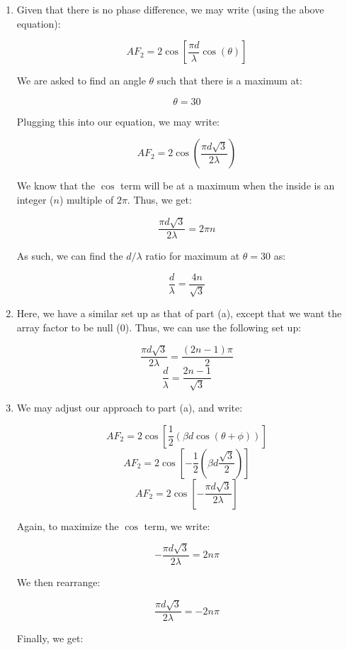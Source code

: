 \begin{enumerate}
    \begin{enumerate}

      \item 

        Given that there is no phase difference, we may write (using the above equation):

        $$AF_2=2\cos\left[ \frac{\pi d}{\lambda}\cos(\theta) \right]$$

        We are asked to find an angle $\theta$ such that there is a maximum at:

        $$\theta=30$$

        Plugging this into our equation, we may write:

        $$AF_2=2\cos\left(\frac{\pi d\sqrt{3}}{2\lambda}\right)$$

        We know that the $\cos$ term will be at a maximum when the inside is an integer ($n$) multiple of $2\pi$. Thus, we get:

        $$\frac{\pi d\sqrt{3}}{2\lambda}=2\pi n$$

        As such, we can find the $d/\lambda$ ratio for maximum at $\theta=30$ as:

        $$\boxed{\frac{d}{\lambda}=\frac{4n}{\sqrt{3}}}$$

      \item 

        Here, we have a similar set up as that of part (a), except that we want the array factor to be null (0). Thus, we can use the following set up:

        $$\frac{\pi d\sqrt{3}}{2\lambda}=\frac{(2n-1)\pi}{2}$$
        $$\boxed{\frac{d}{\lambda}=\frac{2n-1}{\sqrt{3}}}$$

      \item 

        We may adjust our approach to part (a), and write:

        $$AF_2=2\cos\left[ \frac{1}{2}\left( \beta d\cos(\theta+\phi) \right) \right]$$
        $$AF_2=2\cos\left[ -\frac{1}{2}\left( \beta d\frac{\sqrt{3}}{2} \right) \right]$$
        $$AF_2=2\cos\left[ -\frac{\pi d\sqrt{3}}{2\lambda} \right]$$

        Again, to maximize the $\cos$ term, we write:

        $$-\frac{\pi d\sqrt{3}}{2\lambda}=2n\pi$$

        We then rearrange:

        $$\frac{\pi d\sqrt{3}}{2\lambda}=-2n\pi$$

        Finally, we get:


\end{enumerate}
\end{enumerate}
